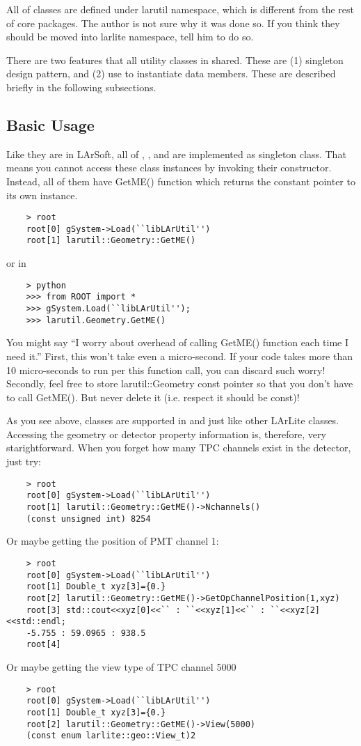 All of \LArUtil classes are defined under {\ttfamily larutil} namespace, which is different from the rest of core packages. The author is not sure why it was done so. If you think they should be moved into {\ttfamily larlite} namespace, tell him to do so.

There are two features that all utility classes in \LArUtil shared. These are (1) singleton design pattern, and (2) use  to instantiate data members. These are described briefly in the following subsections.

\subsection{Basic Usage}
Like they are in LArSoft, all of \Geometry, \LArProperties, and \DetectorProperties are implemented as singleton class. That means you cannot access these class instances by invoking their constructor. Instead, all of them have {\ttfamily GetME()} function which returns the constant pointer to its own instance.
\begin{lstlisting}
    > root
    root[0] gSystem->Load(``libLArUtil'')
    root[1] larutil::Geometry::GetME()
\end{lstlisting}
or in \PyROOT
\begin{lstlisting}
    > python
    >>> from ROOT import *
    >>> gSystem.Load(``libLArUtil'');
    >>> larutil.Geometry.GetME()
\end{lstlisting}
You might say ``I worry about overhead of calling {\ttfamily GetME()} function each time I need it.'' First, this won't take even a micro-second. If your code takes more than 10 micro-seconds to run per this function call, you can discard such worry! Secondly, feel free to store {\ttfamily larutil::Geometry} const pointer so that you don't have to call {\ttfamily GetME()}. But never delete it (i.e. respect it should be const)! 

As you see above, \LArUtil classes are supported in \CINT and \PyROOT just like other LArLite classes. Accessing the geometry or detector property information is, therefore, very starightforward. When you forget how many TPC channels exist in the detector, just try:
\begin{lstlisting}
    > root
    root[0] gSystem->Load(``libLArUtil'')
    root[1] larutil::Geometry::GetME()->Nchannels()
    (const unsigned int) 8254
\end{lstlisting}
Or maybe getting the position of PMT channel 1:
\begin{lstlisting}
    > root
    root[0] gSystem->Load(``libLArUtil'')
    root[1] Double_t xyz[3]={0.}
    root[2] larutil::Geometry::GetME()->GetOpChannelPosition(1,xyz)
    root[3] std::cout<<xyz[0]<<`` : ``<<xyz[1]<<`` : ``<<xyz[2]<<std::endl;
    -5.755 : 59.0965 : 938.5
    root[4] 
\end{lstlisting}
Or maybe getting the view type of TPC channel 5000
\begin{lstlisting}
    > root
    root[0] gSystem->Load(``libLArUtil'')
    root[1] Double_t xyz[3]={0.}
    root[2] larutil::Geometry::GetME()->View(5000)
    (const enum larlite::geo::View_t)2
\end{lstlisting}

